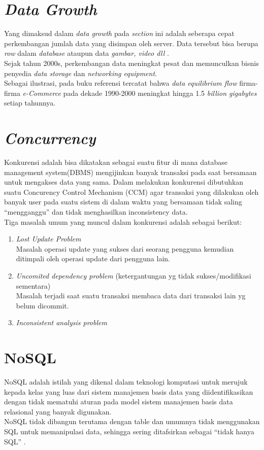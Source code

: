    \section{\textit{Data Growth}}
   Yang dimaksud dalam \textit{data growth} pada \textit{section} ini adalah seberapa cepat perkembangan jumlah data yang disimpan oleh server. Data tersebut bisa berupa \textit{row} dalam \textit{database} ataupun data \textit{gambar, video dll} \cite{insidebigdata_exponential_2017}.
   \\ \indent
   Sejak tahun 2000s, perkembangan data meningkat pesat dan memunculkan bisnis penyedia \textit{data storage} dan \textit{networking equipment}.
   \\ \indent Sebagai ilustrasi, pada buku referensi tercatat bahwa \textit{data equilibrium flow} firma-firma \textit{e-Commerce} pada dekade 1990-2000 meningkat hingga 1.5 \textit{billion gigabytes} setiap tahunnya\cite{d._vanhoose_e-commerce_2011}.
  
   
   \section{\textit{Concurrency}}
   Konkurensi adalah bisa dikatakan sebagai suatu fitur di mana database management system(DBMS) mengijinkan banyak transaksi pada saat bersamaan untuk mengakses data yang sama. Dalam melakukan konkurensi dibutuhkan suatu Concurency Control Mechanism (CCM) agar transaksi yang dilakukan oleh banyak user pada suatu sistem di dalam waktu yang bersamaan tidak saling “mengganggu” dan tidak menghasilkan inconsistency data.
   \\ \indent
   Tiga masalah umum yang muncul dalam konkurensi adalah sebagai berikut: 
	   \begin{enumerate}
	   	\item \textit{Lost Update Problem }\\ \indent Masalah operasi update yang sukses dari seorang pengguna kemudian ditimpali oleh operasi update dari pengguna lain.
	   	\item\textit{ Uncomited dependency problem } (ketergantungan yg tidak sukses/modifikasi sementara) \\ \indent
	   	Masalah terjadi saat suatu transaksi membaca data dari transaksi lain yg belum dicommit.
	   	\item \textit{Inconsistent analysis problem} \cite{noauthor_sistem_2013}
	   \end{enumerate}   
   
   \section{NoSQL}
   NoSQL adalah istilah yang dikenal dalam teknologi komputasi untuk merujuk kepada kelas yang luas dari sistem manajemen basis data yang diidentifikasikan dengan tidak mematuhi aturan pada model sistem manajemen basis data relasional yang banyak digunakan.
   \\ \indent
   NoSQL tidak dibangun terutama dengan table dan umumnya tidak menggunakan SQL untuk memanipulasi data, sehingga sering ditafsirkan sebagai “tidak hanya SQL” \cite{wikipedia_nosql_nodate}.
   
